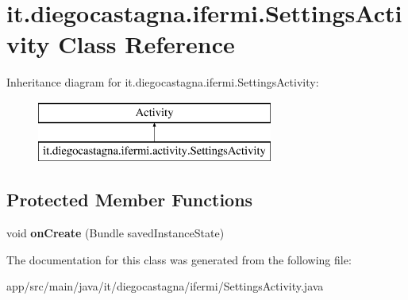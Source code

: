 \hypertarget{classit_1_1diegocastagna_1_1ifermi_1_1_settings_activity}{}\section{it.\+diegocastagna.\+ifermi.\+Settings\+Activity Class Reference}
\label{classit_1_1diegocastagna_1_1ifermi_1_1_settings_activity}
Inheritance diagram for it.\+diegocastagna.\+ifermi.\+Settings\+Activity\+:\begin{figure}[H]
\begin{center}
\leavevmode
\includegraphics[height=2.000000cm]{classit_1_1diegocastagna_1_1ifermi_1_1_settings_activity}
\end{center}
\end{figure}
\subsection*{Protected Member Functions}
\begin{DoxyCompactItemize}
\item 
\mbox{\label{classit_1_1diegocastagna_1_1ifermi_1_1_settings_activity_acb38127f1754de8d6df8f98323db75e0}} 
void {\bfseries on\+Create} (Bundle saved\+Instance\+State)
\end{DoxyCompactItemize}


The documentation for this class was generated from the following file\+:\begin{DoxyCompactItemize}
\item 
app/src/main/java/it/diegocastagna/ifermi/Settings\+Activity.\+java\end{DoxyCompactItemize}
